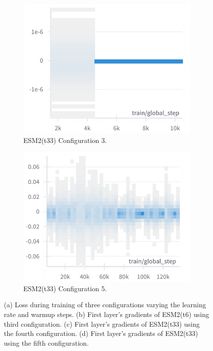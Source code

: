 \begin{figure}[h]
\begin{subfigure}[b]{0.45\textwidth}
		\includegraphics[width=\textwidth]{../img/results/t33_c3_gradients}
		\caption{ESM2(t33) Configuration 3.}
		\label{fig:t33_c3_gradients}
	\end{subfigure}
	\hfill
	\begin{subfigure}[b]{0.45\textwidth}
		\centering
		\includegraphics[width=\textwidth]{../img/results/t33_c5_gradients}
		\caption{ESM2(t33) Configuration 5.}
		\label{fig:t33_c5_gradients}
	\end{subfigure}
	
	
	\caption{(a) Loss during training of three configurations varying the learning rate and warmup steps. (b) First layer's gradients of ESM2(t6) using third configuration. (c) First layer's gradients of ESM2(t33) using the fourth configuration. (d) First layer's gradients of ESM2(t33) using the fifth configuration.}
	\label{fig:training}
\end{figure}


